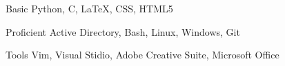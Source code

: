 

\begin{cvhonors}

  \cvhonor
    {Basic} %
    { Python, C, \LaTeX, CSS, HTML5} %

  \cvhonor
    {Proficient} %
    {Active Directory, Bash, Linux, Windows, Git} %

  \cvhonor
    {Tools} %
    {Vim, Visual Stidio, Adobe Creative Suite, Microsoft Office} %


\end{cvhonors}